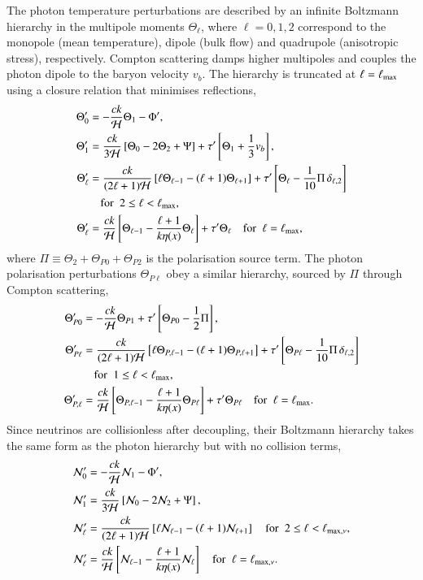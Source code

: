 \documentclass[twocolumn]{aa}
\begin{document}
The photon temperature perturbations are described by an infinite Boltzmann hierarchy in the multipole moments $\Theta_\ell$, where $\ell = 0, 1, 2$ correspond to the monopole (mean temperature), dipole (bulk flow) and quadrupole (anisotropic stress), respectively. Compton scattering damps higher multipoles and couples the photon dipole to the baryon velocity $v_b$. The hierarchy is truncated at $\ell = \ell_{\rm max}$ using a closure relation that minimises reflections,
\begin{align*}
\Theta^\prime_0 &= -\frac{ck}{\mathcal{H}} \Theta_1 - \Phi^\prime, \\
\Theta^\prime_1 &=  \frac{ck}{3\mathcal{H}}\left[\Theta_0 - 2\Theta_2 + \Psi\right] + \tau^\prime\left[\Theta_1 + \frac{1}{3}v_b\right], \\
\Theta^\prime_\ell &= \frac{ck}{(2\ell+1)\mathcal{H}}\left[\ell\Theta_{\ell-1} - (\ell+1)\Theta_{\ell+1}\right] + \tau^\prime\left[\Theta_\ell - \frac{1}{10}\Pi\,\delta_{\ell,2}\right] \\
&\quad \text{for }\;2 \le \ell < \ell_{\rm max}, \\
\Theta_{\ell}^\prime &= \frac{ck}{\mathcal{H}}\left[\Theta_{\ell-1}-\frac{\ell+1}{k\eta(x)}\Theta_\ell\right]+\tau^\prime\Theta_\ell\quad\text{for }\;
\ell = \ell_{\rm max},
\end{align*}
where $\Pi \equiv \Theta_2 + \Theta_{P0} + \Theta_{P2}$ is the polarisation source term. The photon polarisation perturbations $\Theta_{P\ell}$ obey a similar hierarchy, sourced by $\Pi$ through Compton scattering,
\begin{align*}
\Theta^\prime_{P0} &= -\frac{ck}{\mathcal{H}}\Theta_{P1} + \tau^\prime\left[\Theta_{P0} -
\frac{1}{2}\Pi \right], \\
\Theta_{P\ell}^\prime &= \frac{ck}{(2\ell+1)\mathcal{H}}\left[ \ell\Theta_{P,\ell-1} - (\ell+1) \Theta_{P,\ell+1}\right] + \tau^\prime\left[\Theta_{P\ell} -
\frac{1}{10}\Pi\,\delta_{\ell,2}\right]\\
&\quad \text{for }\; 1 \le \ell < \ell_{\rm max}, \\
\Theta_{P,\ell}^\prime &= \frac{ck}{\mathcal{H}}\left[\Theta_{P,\ell-1}-\frac{\ell+1}{k\eta(x)}\Theta_{P\ell}\right]+\tau^\prime\Theta_{P\ell}
\quad \text{for }\;\ell = \ell_{\rm max}.
\end{align*}
Since neutrinos are collisionless after decoupling, their Boltzmann hierarchy takes the same form as the photon hierarchy but with no collision terms,
\begin{align*}
\mathcal{N}^\prime_0 &= -\frac{ck}{\mathcal{H}} \mathcal{N}_1 - \Phi^\prime, \\
\mathcal{N}^\prime_1 &=  \frac{ck}{3\mathcal{H}}\left[\mathcal{N}_0 - 2\mathcal{N}_2 + \Psi\right], \\
\mathcal{N}^\prime_\ell &= \frac{ck}{(2\ell+1)\mathcal{H}}\left[\ell\mathcal{N}_{\ell-1} - (\ell+1)\mathcal{N}_{\ell+1}\right]\quad \text{for }\; 2 \le \ell < 
\ell_{{\rm max},\nu}, \\
\mathcal{N}_{\ell}^\prime &= \frac{ck}{\mathcal{H}}\left[\mathcal{N}_{\ell-1}-\frac{\ell+1}{k\eta(x)}\mathcal{N}_{\ell}\right] \quad \text{for }\; \ell = \ell_{{\rm max},\nu}.
\end{align*}
\end{document}
